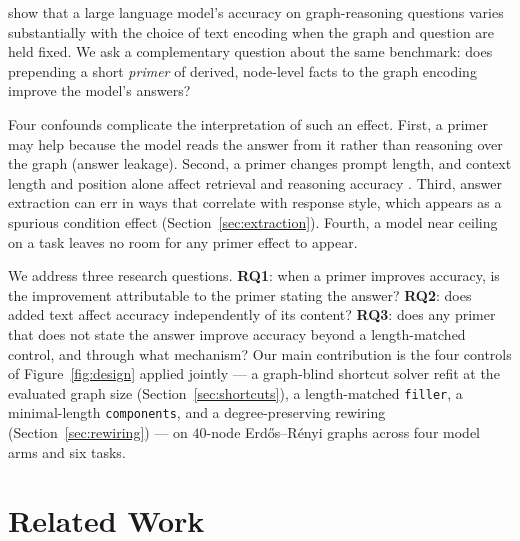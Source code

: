\documentclass[11pt]{article}
\begin{document}
\citet{fatemi2023talklikeagraph} show that a large language model's
accuracy on graph-reasoning questions varies substantially with the choice
of text encoding when the graph and question are held fixed. We ask a
complementary question about the same benchmark: does prepending a short
\emph{primer} of derived, node-level facts to the graph encoding improve
the model's answers?

Four confounds complicate the interpretation of such an effect. First, a
primer may help because the model reads the answer from it rather than
reasoning over the graph (answer leakage). Second, a primer changes prompt
length, and context length and position alone affect retrieval and
reasoning accuracy \citep{liu2024lostinthemiddle,kamradt2023needle,
levy2024sametask}. Third, answer extraction can err in ways that correlate
with response style, which appears as a spurious condition effect
(Section~\ref{sec:extraction}). Fourth, a model near ceiling on a task
leaves no room for any primer effect to appear.

We address three research questions. \textbf{RQ1}: when a primer improves
accuracy, is the improvement attributable to the primer stating the
answer? \textbf{RQ2}: does added text affect accuracy independently of its
content? \textbf{RQ3}: does any primer that does not state the answer
improve accuracy beyond a length-matched control, and through what
mechanism? Our main contribution is the four controls of
Figure~\ref{fig:design} applied jointly --- a graph-blind shortcut solver
refit at the evaluated graph size (Section~\ref{sec:shortcuts}), a
length-matched \texttt{filler}, a minimal-length \texttt{components}, and a
degree-preserving rewiring (Section~\ref{sec:rewiring}) --- on $40$-node
Erd\H{o}s--R\'enyi graphs across four model arms and six tasks.

\section{Related Work}
\label{sec:related-work}
\end{document}
